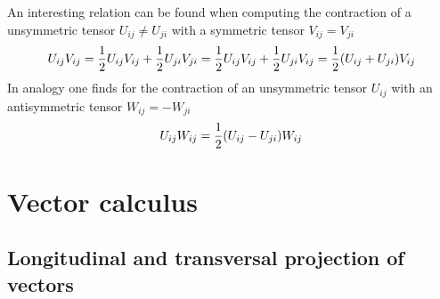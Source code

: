 An interesting relation can be found when computing the contraction of a
unsymmetric tensor $U_{ij} \neq U_{ji}$ with a  symmetric tensor
$V_{ij}=V_{ji}$
\begin{align}
U_{ij}V_{ij}
= \frac{1}{2} U_{ij}V_{ij} + \frac{1}{2} U_{ji}V_{ji} 
= \frac{1}{2} U_{ij}V_{ij} + \frac{1}{2} U_{ji}V_{ij}
= \frac{1}{2} { \left( U_{ij}+U_{ji} \right) } V_{ij}
\label{eq:uscontr}
\end{align}
In analogy one finds for the contraction of an unsymmetric tensor $U_{ij}$ with an
antisymmetric tensor $W_{ij}=-W_{ji}$
\begin{align}
U_{ij}W_{ij} = \frac{1}{2} { \left( U_{ij}-U_{ji} \right) } W_{ij}
\label{eq:uascontr}
\end{align}

\section{Vector calculus}

\subsection{Longitudinal and transversal projection of vectors}


